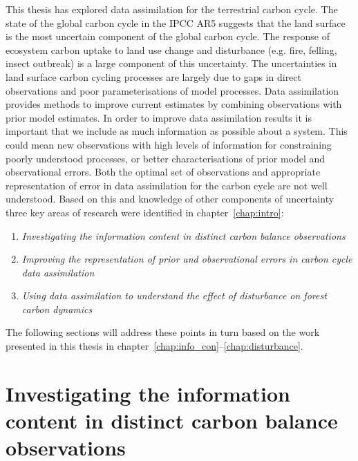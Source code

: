 
This thesis has explored data assimilation for the terrestrial carbon cycle. The state of the global carbon cycle in the IPCC AR5 suggests that the land surface is the most uncertain component of the global carbon cycle. The response of ecosystem carbon uptake to land use change and disturbance (e.g. fire, felling, insect outbreak) is a large component of this uncertainty. The uncertainties in land surface carbon cycling processes are largely due to gaps in direct observations and poor parameterisations of model processes. Data assimilation provides methods to improve current estimates by combining observations with prior model estimates. In order to improve data assimilation results it is important that we include as much information as possible about a system. This could mean new observations with high levels of information for constraining poorly understood processes, or better characterisations of prior model and observational errors. Both the optimal set of observations and appropriate representation of error in data assimilation for the carbon cycle are not well understood. Based on this and knowledge of other components of uncertainty three key areas of research were identified in chapter~\ref{chap:intro}:
\begin{enumerate}
\item \textit{Investigating the information content in distinct carbon balance observations}

\item \textit{Improving the representation of prior and observational errors in carbon cycle data assimilation}

\item \textit{Using data assimilation to understand the effect of disturbance on forest carbon dynamics}
\end{enumerate}
The following sections will address these points in turn based on the work presented in this thesis in chapter~\ref{chap:info_con}--\ref{chap:disturbance}.

\section{Investigating the information content in distinct carbon balance observations}

